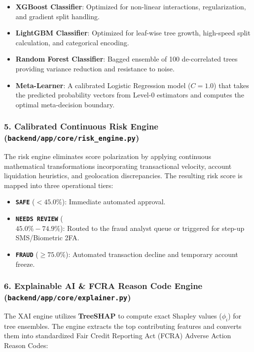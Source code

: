 \documentclass[12pt,a4paper,oneside]{report}
\begin{document}
\begin{itemize}[leftmargin=0.35in]
\item \textbf{XGBoost Classifier}: Optimized for non-linear interactions, regularization, and gradient split handling.
\item \textbf{LightGBM Classifier}: Optimized for leaf-wise tree growth, high-speed split calculation, and categorical encoding.
\item \textbf{Random Forest Classifier}: Bagged ensemble of 100 de-correlated trees providing variance reduction and resistance to noise.
\item \textbf{Meta-Learner}: A calibrated Logistic Regression model ($C=1.0$) that takes the predicted probability vectors from Level-0 estimators and computes the optimal meta-decision boundary.
\end{itemize}

\subsubsection{5. Calibrated Continuous Risk Engine (\texttt{backend/app/core/risk\_engine.py})}
The risk engine eliminates score polarization by applying continuous mathematical transformations incorporating transactional velocity, account liquidation heuristics, and geolocation discrepancies. The resulting risk score is mapped into three operational tiers:

\begin{itemize}[leftmargin=0.35in]
\item [SAFE] \textbf{\texttt{SAFE}} ($< 45.0\%$): Immediate automated approval.
\item [REVIEW] \textbf{\texttt{NEEDS REVIEW}} (\\$45.0\% - 74.9\%$): Routed to the fraud analyst queue or triggered for step-up SMS/Biometric 2FA.
\item [FRAUD] \textbf{\texttt{FRAUD}} ($\ge 75.0\%$): Automated transaction decline and temporary account freeze.
\end{itemize}

\subsubsection{6. Explainable AI \& FCRA Reason Code Engine (\texttt{backend/app/core/explainer.py})}
The XAI engine utilizes \textbf{TreeSHAP} to compute exact Shapley values ($\phi_i$) for tree ensembles. The engine extracts the top contributing features and converts them into standardized Fair Credit Reporting Act (FCRA) Adverse Action Reason Codes:
\end{document}
